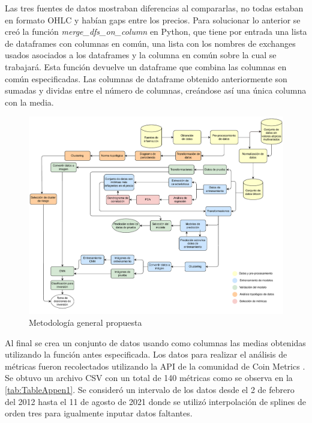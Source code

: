 Las tres fuentes de datos mostraban diferencias al compararlas, no todas estaban en formato OHLC y habían gaps entre los precios. Para solucionar lo anterior se creó la función \emph{merge\_dfs\_on\_column} en Python, que tiene por entrada una lista de dataframes con columnas en común, una lista con los nombres de exchanges usados asociados a los dataframes y la columna en común sobre la cual se trabajará. Esta función devuelve un dataframe que combina las columnas en común especificadas. Las columnas de dataframe obtenido anteriormente son sumadas y dividas entre el número de columnas, creándose así una única columna con la media.
\begin{landscape}
	\begin{figure}
		\centering
		\includegraphics[scale=0.7]{Chapter3/Meto-3.pdf}
		\caption{Metodología general propuesta}
		\label{fig4}
	\end{figure}
\end{landscape}
Al final se crea un conjunto de datos usando como columnas las medias obtenidas utilizando la función antes especificada. 
Los datos para realizar el análisis de métricas fueron recolectados utilizando la API de la comunidad de Coin Metrics \cite{APIBasics}. Se obtuvo un archivo CSV con un total de 140 métricas como se observa en la \autoref{tab:TableAppen1}. Se consideró un intervalo de los datos desde el 2 de febrero del 2012 hasta el 11 de agosto de 2021 donde se utilizó interpolación de splines de orden tres para igualmente inputar datos faltantes.

